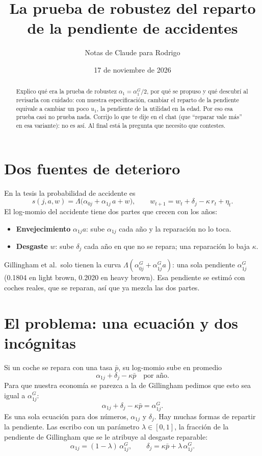 \documentclass[11pt]{article}
\title{La prueba de robustez del reparto de la pendiente de accidentes}
\author{Notas de Claude para Rodrigo}
\date{17 de noviembre de 2026}
\begin{document}
\maketitle

\begin{abstract}
Explico qué era la prueba de robustez $\alpha_1=\alpha_1^G/2$, por qué se propuso y qué
descubrí al revisarla con cuidado: con nuestra especificación, cambiar el reparto de la
pendiente equivale a cambiar un poco $u_1$, la pendiente de la utilidad en la edad. Por eso
esa prueba casi no prueba nada. Corrijo lo que te dije en el chat (que ``reparar vale más''
en esa variante): no es así. Al final está la pregunta que necesito que contestes.
\end{abstract}

\section{Dos fuentes de deterioro}

En la tesis la probabilidad de accidente es
\[
s(j,a,w)=\Lambda\big(\alpha_{0j}+\alpha_{1j}\,a+w\big),
\qquad
w_{t+1}=w_t+\delta_j-\kappa\,r_t+\eta_t .
\]
El log-momio del accidente tiene dos partes que crecen con los años:
\begin{itemize}
  \item \textbf{Envejecimiento} $\alpha_{1j}a$: sube $\alpha_{1j}$ cada año y la reparación no
  lo toca.
  \item \textbf{Desgaste} $w$: sube $\delta_j$ cada año en que no se repara; una reparación lo
  baja $\kappa$.
\end{itemize}

Gillingham et al.\ solo tienen la curva $\Lambda(\alpha^G_{0j}+\alpha^G_{1j}a)$: una sola
pendiente $\alpha^G_{1j}$ (0.1804 en light brown, 0.2020 en heavy brown). Esa pendiente se
estimó con coches reales, que se reparan, así que ya mezcla las dos partes.

\section{El problema: una ecuación y dos incógnitas}

Si un coche se repara con una tasa $\bar p$, su log-momio sube en promedio
\[
\alpha_{1j}+\delta_j-\kappa\bar p \quad\text{por año.}
\]
Para que nuestra economía se parezca a la de Gillingham pedimos que esto sea igual a
$\alpha^G_{1j}$:
\begin{equation}\label{eq:cal}
\alpha_{1j}+\delta_j-\kappa\bar p=\alpha^G_{1j}.
\end{equation}
Es una sola ecuación para dos números, $\alpha_{1j}$ y $\delta_j$. Hay muchas formas de repartir
la pendiente. Las escribo con un parámetro $\lambda\in[0,1]$, la fracción de la pendiente de
Gillingham que se le atribuye al desgaste reparable:
\[
\alpha_{1j}=(1-\lambda)\,\alpha^G_{1j},
\qquad
\delta_j=\kappa\bar p+\lambda\,\alpha^G_{1j}.
\]
\end{document}
